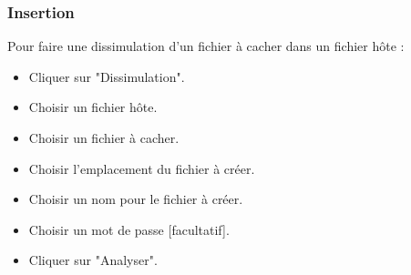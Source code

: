 \documentclass[11pt]{article}
\begin{document}
\subsubsection{Insertion}

Pour faire une dissimulation d'un fichier à cacher dans un fichier hôte : 
\begin{itemize}
\item Cliquer sur "Dissimulation".
\item Choisir un fichier hôte. 
\item Choisir un fichier à cacher. 
\item Choisir l'emplacement du fichier à créer. 
\item Choisir un nom pour le fichier à créer. 
\item Choisir un mot de passe [facultatif]. 
\item Cliquer sur "Analyser". 
\end{itemize}
\end{document}
